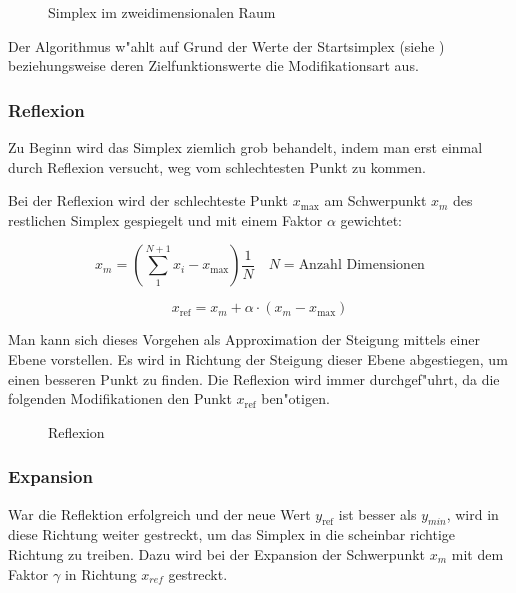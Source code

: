 \begin{figure}[ht]
	\centering
  	\caption{Simplex im zweidimensionalen Raum}%
	\label{fig:downhillStart}
\end{figure}

Der Algorithmus w"ahlt auf Grund der Werte der Startsimplex (siehe
) beziehungsweise deren Zielfunktionswerte
die Modifikationsart aus.

\subsubsection{Reflexion}

Zu Beginn wird das Simplex ziemlich grob behandelt, indem man erst einmal
durch Reflexion versucht, weg vom schlechtesten Punkt zu kommen.

Bei der Reflexion wird der schlechteste Punkt $x_{\text{max}}$ am
Schwerpunkt $x_m$ des restlichen Simplex gespiegelt und mit einem Faktor
$\alpha$ gewichtet:

\begin{equation}
x_m = \left(\sum_1^{N+1} x_i - x_{\text{max}}\right) \frac{1}{N} \quad N = \text{Anzahl Dimensionen}
\end{equation}

\begin{equation}
x_{\text{ref}} = x_m + \alpha \cdot (x_m-x_{\text{max}})
\end{equation}

Man kann sich dieses Vorgehen als Approximation der Steigung mittels
einer Ebene vorstellen. Es wird in Richtung der Steigung dieser Ebene
abgestiegen, um einen besseren Punkt zu finden. Die Reflexion wird
immer durchgef"uhrt, da die folgenden Modifikationen den Punkt $x_{\text{ref}}$
ben"otigen.

\begin{figure}[ht]
	\centering
  	\caption{Reflexion}%
	\label{fig:Reflexion}%
\end{figure}

\subsubsection{Expansion}
War die Reflektion erfolgreich und der neue Wert $y_{\text{ref}}$ ist besser als $y_{min}$, wird in diese Richtung weiter gestreckt, um das Simplex in die scheinbar richtige Richtung zu treiben.
Dazu wird bei der Expansion der Schwerpunkt $x_m$ mit dem Faktor $\gamma$ in Richtung $x_{ref}$ gestreckt.


